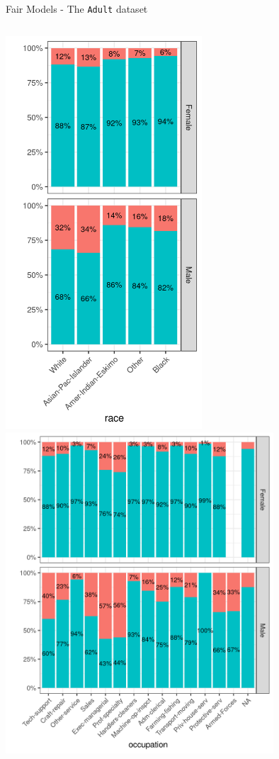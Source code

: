 \documentclass[11pt,compress,t,notes=noshow,xcolor=table]{beamer}
\begin{document}
\begin{vbframe}{Fair Models - The \texttt{Adult} dataset}
\begin{columns}
\begin{column}{0.5\textwidth}
\includegraphics[width=0.55\textwidth]{figure_man/dataset_adult_race.png}%
\includegraphics[width=0.75\textwidth]{figure_man/dataset_adult_education.png}
\end{column}
\end{columns}

\end{vbframe}
\end{document}
